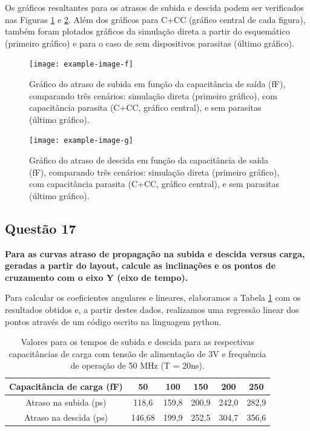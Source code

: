 ﻿\documentclass[12pt,a4paper]{article}
\begin{document}
Os gráficos resultantes para os atrasos de subida e descida podem ser verificados nas Figuras \ref{fig:delay_subida_cc} e \ref{fig:delay_descida_cc}. Além dos gráficos para C+CC (gráfico central de cada figura), também foram plotados gráficos da simulação direta a partir do esquemático (primeiro gráfico) e para o caso de sem dispositivos parasitas (último gráfico).

\begin{figure}[H]
    \centering
    \texttt{[image: example-image-f]}
    \caption{Gráfico do atraso de subida em função da capacitância de saída (fF), comparando três cenários: simulação direta (primeiro gráfico), com capacitância parasita (C+CC, gráfico central), e sem parasitas (último gráfico).}
    \label{fig:delay_subida_cc}
\end{figure}

\begin{figure}[H]
    \centering
    \texttt{[image: example-image-g]}
    \caption{Gráfico do atraso de descida em função da capacitância de saída (fF), comparando três cenários: simulação direta (primeiro gráfico), com capacitância parasita (C+CC, gráfico central), e sem parasitas (último gráfico).}
    \label{fig:delay_descida_cc}
\end{figure}

\subsection*{Questão 17}

	\textbf{Para as curvas atraso de propagação na subida e descida versus carga, geradas a partir do layout, calcule as inclinações e os pontos de cruzamento com o eixo Y (eixo de tempo).}

Para calcular os coeficientes angulares e lineares, elaboramos a Tabela \ref{tab:delay_values} com os resultados obtidos e, a partir destes dados, realizamos uma regressão linear dos pontos através de um código escrito na linguagem python.

\begin{table}[H]
    \centering
    \caption{Valores para os tempos de subida e descida para as respectivas capacitâncias de carga com tensão de alimentação de 3V e frequência de operação de 50 MHz (T = 20ns).}
    \label{tab:delay_values}
    \begin{tabular}{cccccc}
        \toprule
        Capacitância de carga (fF) & 50 & 100 & 150 & 200 & 250 \\
        \midrule
        Atraso na subida (ps) & 118,6 & 159,8 & 200,9 & 242,0 & 282,9 \\
        Atraso na descida (ps) & 146,68 & 199,9 & 252,5 & 304,7 & 356,6 \\
        \bottomrule
    \end{tabular}
\end{table}
\end{document}

